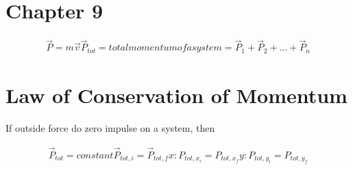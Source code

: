 \section{Chapter 9}
	\begin{align}
		\vec{P} = m\vec{v}
		\vec{P}_{tot} = total momentum of a system
		= \vec{P}_{1} + \vec{P}_{2} + ... + \vec{P}_{n}
	\end{align}

\section{Law of Conservation of Momentum}

	If outside force do zero impulse on a system, then

	\begin{align}
		\vec{P}_{tot} = constant
		\vec{P}_{tot,i} = \vec{P}_{tot,f}
		x: P_{tot,x_{i}} = P_{tot,x_{f}}
		y: P_{tot,y_{i}} = P_{tot,y_{f}}
	\end{align}

